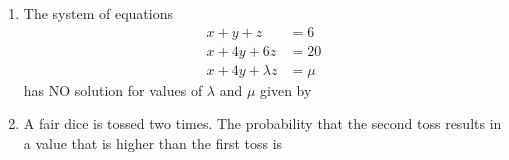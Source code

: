\documentclass[a4paper, 11pt]{article}
\begin{document}
\begin{enumerate}
    \begin{enumerate}
    \end{enumerate}
    
    \hfill{}

    \item The system of equations
    \begin{align*}
        x+y+z &= 6 \\
        x+4y+6z &= 20 \\
        x+4y+\lambda z &= \mu
    \end{align*}
    has NO solution for values of $\lambda$ and $\mu$ given by
    
    \begin{enumerate}
    \end{enumerate}

    \hfill{}

    \item A fair dice is tossed two times. The probability that the second toss results in a value that is higher than the first toss is
    
    \begin{enumerate}
    \end{enumerate}


\end{enumerate}
\end{document}

